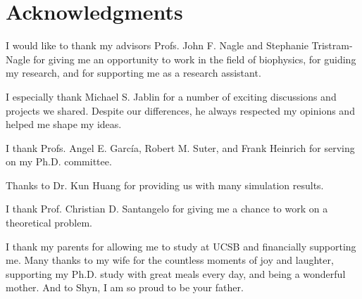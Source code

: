 \section*{Acknowledgments}

I would like to thank my advisors Profs. John F. Nagle and Stephanie
Tristram-Nagle for giving me an opportunity to work in the field of biophysics,
for guiding my research, and for supporting me as a research assistant. 

I especially thank Michael S. Jablin for a number of exciting discussions and 
projects we shared. Despite our differences, he always respected my opinions
and helped me shape my ideas.

I thank Profs. Angel E. Garc\'{i}a, Robert M. Suter, and Frank Heinrich
for serving on my Ph.D. committee.

Thanks to Dr. Kun Huang for providing us with many simulation results.

I thank Prof. Christian D. Santangelo for giving me a chance to work on 
a theoretical problem. 

I thank my parents for allowing me to study at UCSB and financially supporting
me.
Many thanks to my wife for the countless moments of joy and laughter,
supporting my Ph.D. study with great meals every day, and being a wonderful 
mother.
And to Shyn, I am so proud to be your father.
